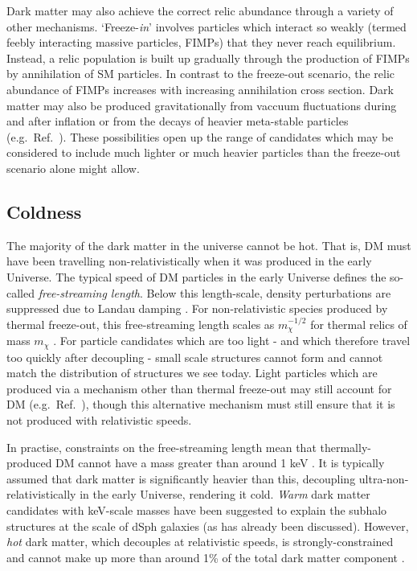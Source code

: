 Dark matter may also achieve the correct relic abundance through a variety of other mechanisms. `Freeze-\textit{in}' \cite{Hall:2009} involves particles which interact so weakly (termed feebly interacting massive particles, FIMPs) that they never reach equilibrium. Instead, a relic population is built up gradually through the production of FIMPs by annihilation of SM particles. In contrast to the freeze-out scenario, the relic abundance of FIMPs increases with increasing annihilation cross section. Dark matter may also be produced gravitationally from vaccuum fluctuations during and after inflation \cite{Chung:1998, Kuzmin:1998} or from the decays of heavier meta-stable particles (e.g.~Ref.~\cite{Gherghetta:1999}). These possibilities open up the range of candidates which may be considered to include much lighter or much heavier particles than the freeze-out scenario alone might allow.



\subsection{Coldness}

The majority of the dark matter in the universe cannot be hot. That is, DM must have been travelling non-relativistically when it was produced in the early Universe. The typical speed of DM particles in the early Universe defines the so-called \textit{free-streaming length}. Below this length-scale, density perturbations are suppressed due to Landau damping \cite{Bond:1983}. For non-relativistic species produced by thermal freeze-out, this free-streaming length scales as $m_\chi^{-1/2}$ for thermal relics of mass $m_\chi$ \cite{Boyanovsky:2008}. For particle candidates which are too light - and which therefore travel too quickly after decoupling - small scale structures cannot form and cannot match the distribution of structures we see today. Light particles which are produced via a mechanism other than thermal freeze-out may still account for DM (e.g.~Ref.~\cite{Wantz:2011}), though this alternative mechanism must still ensure that it is not produced with relativistic speeds.

In practise, constraints on the free-streaming length mean that thermally-produced DM cannot have a mass greater than around 1 keV \cite{Narayanan:2000}. It is typically assumed that dark matter is significantly heavier than this, decoupling ultra-non-relativistically in the early Universe, rendering it cold.  \textit{Warm} dark matter candidates with keV-scale masses have been suggested to explain the subhalo structures at the scale of dSph galaxies (as has already been discussed). However, \textit{hot} dark matter, which decouples at relativistic speeds, is strongly-constrained and cannot make up more than around 1\% of the total dark matter component \cite{Abazajian:2005, dePutter:2012}.


